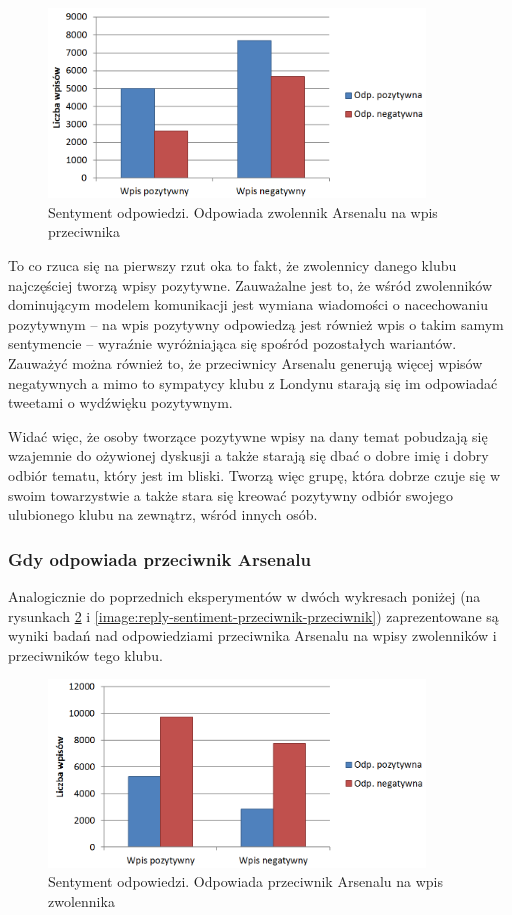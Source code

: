 \begin{figure}[ht!]
\centering
\includegraphics[width=100mm]{img/reply-sentiment-zwolennik-przeciwnik.png}
\caption{Sentyment odpowiedzi. Odpowiada zwolennik Arsenalu na wpis przeciwnika}
\label{image:reply-sentiment-zwolennik-przeciwnik}
\end{figure}



To co rzuca się na pierwszy rzut oka to fakt, że 
zwolennicy danego klubu najczęściej tworzą wpisy pozytywne. Zauważalne jest to,
że wśród zwolenników dominującym modelem komunikacji jest wymiana wiadomości
o nacechowaniu pozytywnym -- na wpis pozytywny odpowiedzą jest również wpis o 
takim samym sentymencie -- wyraźnie wyróżniająca się spośród pozostałych
wariantów.
Zauważyć można również to, że przeciwnicy Arsenalu generują więcej wpisów 
negatywnych a mimo to sympatycy klubu z Londynu starają się im odpowiadać
tweetami o wydźwięku pozytywnym.

Widać więc, że osoby tworzące pozytywne wpisy na dany temat pobudzają się
wzajemnie do ożywionej dyskusji a także starają się dbać o dobre imię
i dobry odbiór tematu, który jest im bliski. Tworzą więc grupę, która
dobrze czuje się w swoim towarzystwie a także stara się kreować
pozytywny odbiór swojego ulubionego klubu na zewnątrz, wśród innych osób.

\subsubsection{Gdy odpowiada przeciwnik Arsenalu}
Analogicznie do poprzednich eksperymentów w dwóch wykresach poniżej (na 
rysunkach \ref{image:reply-sentiment-przeciwnik-zwolennik} i 
\ref{image:reply-sentiment-przeciwnik-przeciwnik}) zaprezentowane są
wyniki badań nad odpowiedziami przeciwnika Arsenalu na wpisy zwolenników
i przeciwników tego klubu.

\begin{figure}[ht!] \centering
\includegraphics[width=100mm]{img/reply-sentiment-przeciwnik-zwolennik.png}
\caption{Sentyment odpowiedzi. Odpowiada przeciwnik Arsenalu na wpis zwolennika}
\label{image:reply-sentiment-przeciwnik-zwolennik}
\end{figure}

